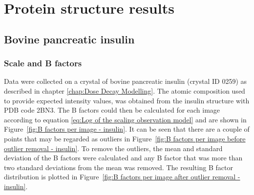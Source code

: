 \section{Protein structure results}
\label{sec:Protein Structure Results}

\subsection{Bovine pancreatic insulin}
\label{sub:Bovine pancreatic insulin}

\subsubsection{Scale and B factors}
\label{subs:Scale and B factors - insulin}
Data were collected on a crystal of bovine pancreatic insulin (crystal ID 0259) as described in chapter \ref{chap:Dose Decay Modelling}.
The atomic composition used to provide expected intensity values, was obtained from the insulin structure with PDB code 2BN3.
The B factors could then be calculated for each image according to equation \ref{eq:Log of the scaling observation model} and are shown in Figure~\ref{fig:B factors per image - insulin}.
It can be seen that there are a couple of points that may be regarded as outliers in Figure~\ref{fig:B factors per image before outlier removal - insulin}.
To remove the outliers, the mean and standard deviation of the B factors were calculated and any B factor that was more than two standard deviations from the mean was removed.
The resulting B factor distribution is plotted in Figure~\ref{fig:B factors per image after outlier removal - insulin}.
